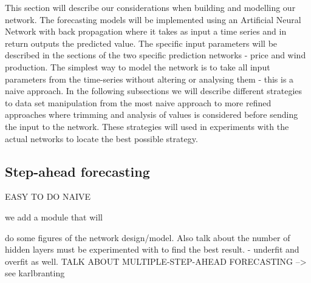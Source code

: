 This section will describe our considerations when building and modelling our network. The forecasting models will be implemented using an Artificial Neural Network with back propagation where it takes as input a time series and in return outputs the predicted value. The specific input parameters will be described in the sections of the two specific prediction networks - price and wind production.
The simplest way to model the network is to take all input parameters from the time-series without altering or analysing them - this is a naive approach. In the following subsections we will describe different strategies to data set manipulation from the most naive approach to more refined approaches where trimming and analysis of values is considered before sending the input to the network. These strategies will used in experiments with the actual networks to locate the best possible strategy.

\subsection{Step-ahead forecasting}

\sub




  EASY TO DO NAIVE

we add a module that will 



do some figures of the network design/model. Also talk about the number of hidden layers must be experimented with to find the best result. - underfit and overfit as well.
TALK ABOUT MULTIPLE-STEP-AHEAD FORECASTING --> see karlbranting